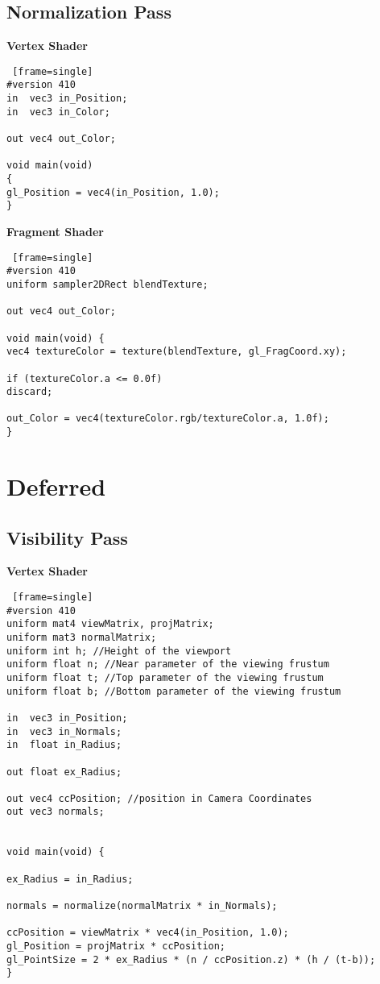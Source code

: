 \subsection{Normalization Pass}
\textbf{Vertex Shader}
\begin{lstlisting} [frame=single]
#version 410
in  vec3 in_Position;
in 	vec3 in_Color;

out vec4 out_Color;

void main(void)
{
gl_Position = vec4(in_Position, 1.0);
}
\end{lstlisting}

\textbf{Fragment Shader}
\begin{lstlisting} [frame=single]
#version 410
uniform sampler2DRect blendTexture;

out vec4 out_Color;

void main(void) {
vec4 textureColor = texture(blendTexture, gl_FragCoord.xy);

if (textureColor.a <= 0.0f)
discard;

out_Color = vec4(textureColor.rgb/textureColor.a, 1.0f);
}
\end{lstlisting}
\newpage

\section{Deferred \label{deferred}}
\subsection{Visibility Pass}
\textbf{Vertex Shader}
\begin{lstlisting} [frame=single]
#version 410
uniform mat4 viewMatrix, projMatrix;
uniform mat3 normalMatrix;
uniform int h; //Height of the viewport
uniform float n; //Near parameter of the viewing frustum
uniform float t; //Top parameter of the viewing frustum
uniform float b; //Bottom parameter of the viewing frustum

in  vec3 in_Position;
in 	vec3 in_Normals;
in  float in_Radius;

out float ex_Radius;

out vec4 ccPosition; //position in Camera Coordinates
out vec3 normals;


void main(void) {

ex_Radius = in_Radius;

normals = normalize(normalMatrix * in_Normals);

ccPosition = viewMatrix * vec4(in_Position, 1.0);
gl_Position = projMatrix * ccPosition;
gl_PointSize = 2 * ex_Radius * (n / ccPosition.z) * (h / (t-b));
}
\end{lstlisting}
\newpage

